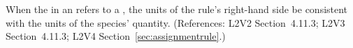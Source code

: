 When the  in an \AssignmentRule refers to a \Species, the
units of the rule's right-hand side  be consistent with the units of
the species' quantity.  (References: L2V2 Section~4.11.3;
L2V3 Section~4.11.3; L2V4 Section~\ref{sec:assignmentrule}.)
